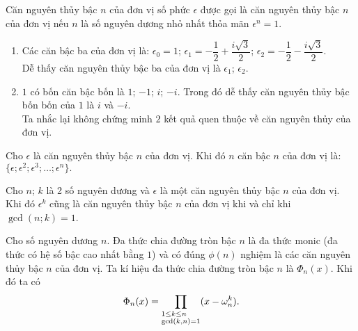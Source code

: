 \begin{dn}
	Căn nguyên thủy bậc $n$ của đơn vị số phức $\epsilon$ được gọi là căn nguyên thủy bậc $n$ của đơn vị nếu $n$ là số nguyên dương nhỏ nhất thỏa mãn $\epsilon^n = 1$.
\end{dn}

\begin{vd}\text{}
\begin{enumerate}
	\item Các căn bậc ba của đơn vị là:
	$\epsilon_0=1$; $\epsilon_1= -\dfrac{1}{2}+\dfrac{i\sqrt3}{2}$; $\epsilon_2= -\dfrac{1}{2}-\dfrac{i\sqrt3}{2}$.\\
	Dễ thấy căn nguyên thủy bậc ba của đơn vị là $\epsilon_1$; $\epsilon_2$. 
	\item $1$ có bốn căn bậc bốn là $1$; $-1$; $i$;  $-i$. Trong đó dễ thấy căn nguyên thủy bậc bốn bốn của $1$ là $i$ và $-i$.\\
	Ta nhắc lại không chứng minh $2$ kết quả quen thuộc về căn nguyên thủy của đơn vị.
\end{enumerate}
\end{vd}

\begin{dl}\label{dl2.1.3}
	Cho $\epsilon$  là căn nguyên thủy bậc $n$ của đơn vị. Khi đó $n$ căn bậc $n$ của đơn vị là: $\{\epsilon; \epsilon^2; \epsilon^3; \ldots; \epsilon^n\}.$
\end{dl}

\begin{dl}\label{dl2.1.4}
	Cho $n$; $k$ là 2 số nguyên dương và $\epsilon$ là một căn nguyên thủy bậc $n$ của đơn vị. Khi đó $\epsilon^k$ cũng là căn nguyên thủy bậc $n$ của đơn vị khi và chỉ khi $\gcd(n; k) = 1$.
	
	
\end{dl}

\begin{dn}
	Cho số nguyên dương $n$. Đa thức chia đường tròn bậc $n$ là đa thức monic
	(đa thức có hệ số bậc cao nhất bằng $1$) và có đúng $\phi(n)$ nghiệm là các căn nguyên thủy bậc $n$
	của đơn vị. Ta kí hiệu đa thức chia đường tròn bậc $n$ là $\Phi_n(x)$. Khi đó ta có
\begin{displaymath}
\Phi_n(x)=\prod\limits_{\begin{subarray}{l}  1\le k\le n\\
	 \gcd (k,n)=1
	\end{subarray}} (x-\omega_n^k).
\end{displaymath}

	
\end{dn}

